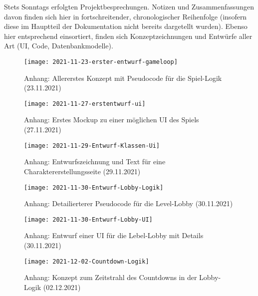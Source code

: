 Stets Sonntags erfolgten Projektbesprechungen. Notizen und Zusammenfassungen davon finden sich hier in fortschreitender, chronologischer Reihenfolge (insofern diese im Hauptteil der Dokumentation nicht bereits dargetellt wurden). Ebenso hier entsprechend einsortiert, finden sich Konzeptzeichnungen und Entwürfe aller Art (UI, Code, Datenbankmodelle).



\begin{figure}[H]
    \centering
    \caption{Anhang: Allererstes Konzept mit Pseudocode für die Spiel-Logik (23.11.2021)}
    \label{fig:2021-11-23-erster-entwurf-gameloop}
    \texttt{[image: 2021-11-23-erster-entwurf-gameloop]}
\end{figure}





\begin{figure}[H]
    \centering
    \caption{Anhang: Erstes Mockup zu einer möglichen UI des Spiels (27.11.2021)}
    \label{fig:2021-11-27-erstentwurf-ui}
    \texttt{[image: 2021-11-27-erstentwurf-ui]}
\end{figure}


\begin{figure}[H]
    \centering
    \caption{Anhang: Entwurfszeichnung und Text für eine Charaktererstellungsseite (29.11.2021)}
    \label{fig:2021-11-29-Entwurf-Klassen-Ui}
    \texttt{[image: 2021-11-29-Entwurf-Klassen-Ui]}
\end{figure}


\begin{figure}[H]
    \centering
    \caption{Anhang: Detailierterer Pseudocode für die Level-Lobby (30.11.2021)}
    \label{fig:2021-11-30-Entwurf-Lobby-Logik}
    \texttt{[image: 2021-11-30-Entwurf-Lobby-Logik]}
\end{figure}


\begin{figure}[H]
    \centering
    \caption{Anhang: Entwurf einer UI für die Lebel-Lobby mit Details (30.11.2021)}
    \label{fig:2021-11-30-Entwurf-Lobby-UI}
    \texttt{[image: 2021-11-30-Entwurf-Lobby-UI]}
\end{figure}


\begin{figure}[H]
    \centering
    \caption{Anhang: Konzept zum Zeitstrahl des Countdowns in der Lobby-Logik (02.12.2021)}
    \label{fig:2021-12-02-Countdown-Logik}
    \texttt{[image: 2021-12-02-Countdown-Logik]}
\end{figure}

